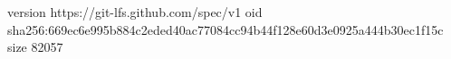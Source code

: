 version https://git-lfs.github.com/spec/v1
oid sha256:669ec6e995b884c2eded40ac77084cc94b44f128e60d3e0925a444b30ec1f15c
size 82057

